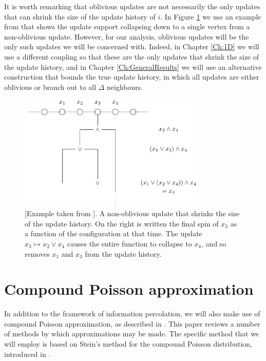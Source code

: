 	
	It is worth remarking that oblivious updates are not necessarily the only updates that can shrink the size of the update history of $i$. In Figure \ref{fig:nonoblivious shrink} we use an example from \cite{Lubetzky2016-wd} that shows the update support collapsing down to a single vertex from a non-oblivious update. However, for our analysis, oblivious updates will be the only such updates we will be concerned with. Indeed, in Chapter \ref{Ch:1D} we will use a different coupling so that these are the only updates that shrink the size of the update history, and in Chapter \ref{Ch:GeneralResults} we will use an alternative construction that bounds the true update history, in which all updates are either oblivious or branch out to all $\Delta$ neighbours.

	\begin{figure}
		\centering
		\includegraphics[width = 0.8\textwidth]{Figures/IsingCouplingTime/nonoblivious_shrink.pdf}
		\caption[A non-oblivious update that shrinks the size of the update history]{[Example taken from \cite{Lubetzky2016-wd}]. A non-oblivious update that shrinks the size of the update history. On the right is written the final spin of $x_3$ as a function of the configuration at that time. The update $x_3 \mapsto x_2 \vee x_4$ causes the entire function to collapse to $x_4$, and so removes $x_1$ and $x_3$ from the update history.}
		\label{fig:nonoblivious shrink}
	\end{figure}
	

\section{Compound Poisson approximation}
\label{sec:compound poisson overview}
	In addition to the framework of information percolation, we will also make use of compound Poisson approximation, as described in \cite{Barbour2001-nh}. This paper reviews a number of methods by which approximations may be made. The specific method that we will employ is based on Stein's method for the compound Poisson distribution, introduced in \cite{Barbour1992-mc}.

